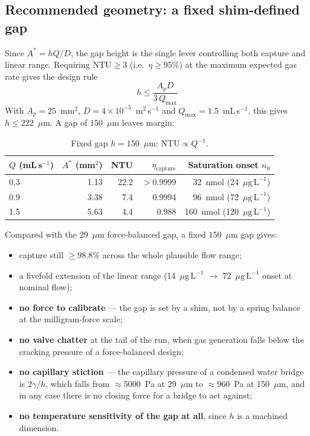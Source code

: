 \documentclass[11pt,a4paper]{article}
\newcommand{\ptl}{\ensuremath{\mu\mathrm{g\,L^{-1}}}}
\newcommand{\um}{\ensuremath{\mu\mathrm{m}}}
\begin{document}
\subsection{Recommended geometry: a fixed shim-defined gap}
\label{sec:fixedgap}

Since $A^{*} = hQ/D$, the gap height is the single lever controlling both
capture and linear range. Requiring $\mathrm{NTU} \geq 3$ (i.e.\
$\eta \geq 95$\%) at the maximum expected gas rate gives the design rule
\begin{equation}
  \boxed{\;h \leq \frac{A_p D}{3\,Q_{\max}}\;}
  \label{eq:designrule}
\end{equation}
With $A_p = 25$~mm$^2$, $D = 4\times10^{-5}$~m$^2$\,s$^{-1}$ and
$Q_{\max} = 1.5$~mL\,s$^{-1}$, this gives $h \leq 222$~\um{}. A gap of
$150$~\um{} leaves margin:

\begin{table}[h]
\centering
\caption{Fixed gap $h = 150$~\um{}: $\mathrm{NTU} \propto Q^{-1}$.}
\begin{tabular}{lrrrr}
\toprule
$Q$ (mL\,s$^{-1}$) & $A^{*}$ (mm$^2$) & NTU
& $\eta_{\text{capture}}$ & Saturation onset $n_0$ \\
\midrule
0.3 & 1.13 & 22.2 & $>0.9999$ & 32~nmol (24~\ptl{})\\
0.9 & 3.38 & 7.4  & 0.9994 & 96~nmol (72~\ptl{})\\
1.5 & 5.63 & 4.4  & 0.988  & 160~nmol (120~\ptl{})\\
\bottomrule
\end{tabular}
\end{table}

\noindent
Compared with the $29$~\um{} force-balanced gap, a fixed $150$~\um{} gap
gives:
\begin{itemize}[nosep]
  \item capture still $\geq 98.8$\% across the whole plausible flow range;
  \item a fivefold extension of the linear range
        (14~\ptl{} $\rightarrow$ 72~\ptl{} onset at nominal flow);
  \item \textbf{no force to calibrate} --- the gap is set by a shim, not by
        a spring balance at the milligram-force scale;
  \item \textbf{no valve chatter} at the tail of the run, when gas
        generation falls below the cracking pressure of a force-balanced
        design;
  \item \textbf{no capillary stiction} --- the capillary pressure of a
        condensed water bridge is $2\gamma/h$, which falls from
        $\approx 5000$~Pa at 29~\um{} to $\approx 960$~Pa at 150~\um{}, and
        in any case there is no closing force for a bridge to act against;
  \item \textbf{no temperature sensitivity of the gap at all}, since $h$ is
        a machined dimension.
\end{itemize}
\end{document}
